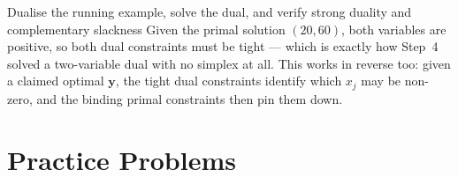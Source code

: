 \begin{worked}{Dualise the running example, solve the dual, and verify strong duality and complementary slackness}
Given the primal solution $(20,60)$, both variables are positive, so both
dual constraints must be tight --- which is exactly how Step~4 solved a
two-variable dual with no simplex at all. This works in reverse too: given a
claimed optimal $\mathbf y$, the tight dual constraints identify which
$x_{j}$ may be non-zero, and the binding primal constraints then pin them
down.
\end{worked}

\section{Practice Problems}

